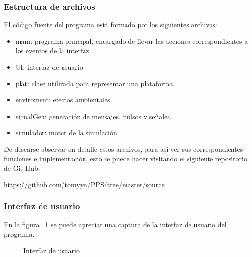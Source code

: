 \documentclass[a4paper,10pt]{article}
\begin{document}
\subsubsection{Estructura de archivos}
El código fuente del programa  está formado por los siguientes archivos:
\begin{itemize}
\item main: programa principal, encargado de llevar las acciones correspondientes a los eventos de la interfaz.
\item UI: interfaz de usuario.
\item plat: clase utilizada para representar una plataforma.
\item enviroment: efectos ambientales.
\item signalGen: generación de mensajes, pulsos y señales.
\item simulador: motor de la simulación.
\end{itemize}
De desearse observar en detalle estos archivos, para así ver sus correspondientes funciones e implementación, esto se puede hacer visitando el siguiente  repositorio de Git Hub: 
\par
\textcolor{blue}{\url{https://github.com/tomyyn/PPS/tree/master/source}}

\subsubsection{Interfaz de usuario}
En la figura ~\ref{UI} se puede apreciar una captura de la interfaz de usuario del programa.

\begin{figure}[H]
\centering
{}
\caption{Interfaz de usuario}
\label{UI}
\end{figure}
\end{document}
